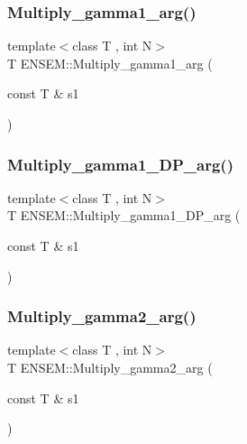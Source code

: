 \mbox{\label{namespaceENSEM_a98f0db7dcdeff4267b1a6f0c13360ba0}} 
\subsubsection{\texorpdfstring{Multiply\_gamma1\_arg()}{Multiply\_gamma1\_arg()}}
{\footnotesize\ttfamily template$<$class T , int N$>$ \\
T E\+N\+S\+E\+M\+::\+Multiply\+\_\+gamma1\+\_\+arg (\begin{DoxyParamCaption}\item[{const T \&}]{s1 }\end{DoxyParamCaption})\hspace{0.3cm}{\ttfamily [inline]}}

\mbox{\label{namespaceENSEM_aa25e619806d7f439f5adb3d1102d28d0}} 
\subsubsection{\texorpdfstring{Multiply\_gamma1\_DP\_arg()}{Multiply\_gamma1\_DP\_arg()}}
{\footnotesize\ttfamily template$<$class T , int N$>$ \\
T E\+N\+S\+E\+M\+::\+Multiply\+\_\+gamma1\+\_\+\+D\+P\+\_\+arg (\begin{DoxyParamCaption}\item[{const T \&}]{s1 }\end{DoxyParamCaption})\hspace{0.3cm}{\ttfamily [inline]}}

\mbox{\label{namespaceENSEM_a0bf52041fa6010680a898ffed180b575}} 
\subsubsection{\texorpdfstring{Multiply\_gamma2\_arg()}{Multiply\_gamma2\_arg()}}
{\footnotesize\ttfamily template$<$class T , int N$>$ \\
T E\+N\+S\+E\+M\+::\+Multiply\+\_\+gamma2\+\_\+arg (\begin{DoxyParamCaption}\item[{const T \&}]{s1 }\end{DoxyParamCaption})\hspace{0.3cm}{\ttfamily [inline]}}

